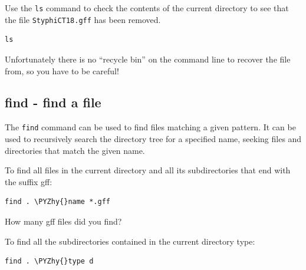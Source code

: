 \documentclass[11pt]{article}
\makeatletter
\def\PYZhy{\char`\-}
\newcommand{\boxspacing}{\kern\kvtcb@left@rule\kern\kvtcb@boxsep}
\newcommand{\prompt}[4]{
        {\ttfamily\llap{{\color{blue}\LARGE\faKeyboardO\hspace{3pt}#4}}\vspace{-\baselineskip}}
    }
\makeatother
\begin{document}
    Use the \texttt{ls} command to check the contents of the current
directory to see that the file \texttt{StyphiCT18.gff} has been removed.

    \begin{tcolorbox}[breakable, size=fbox, boxrule=1pt, pad at break*=1mm,colback=cellbackground, colframe=cellborder]
\prompt{In}{incolor}{ }{\boxspacing}
\begin{Verbatim}[commandchars=\\\{\}]
ls
\end{Verbatim}
\end{tcolorbox}

    Unfortunately there is no ``recycle bin'' on the command line to recover
the file from, so you have to be careful!

    \hypertarget{find---find-a-file}{%
\subsection{find - find a file}\label{find---find-a-file}}

The \texttt{find} command can be used to find files matching a given
pattern. It can be used to recursively search the directory tree for a
specified name, seeking files and directories that match the given name.

    To find all files in the current directory and all its subdirectories
that end with the suffix gff:

    \begin{tcolorbox}[breakable, size=fbox, boxrule=1pt, pad at break*=1mm,colback=cellbackground, colframe=cellborder]
\prompt{In}{incolor}{ }{\boxspacing}
\begin{Verbatim}[commandchars=\\\{\}]
find . \PYZhy{}name *.gff
\end{Verbatim}
\end{tcolorbox}

    How many gff files did you find?

    To find all the subdirectories contained in the current directory type:

    \begin{tcolorbox}[breakable, size=fbox, boxrule=1pt, pad at break*=1mm,colback=cellbackground, colframe=cellborder]
\prompt{In}{incolor}{ }{\boxspacing}
\begin{Verbatim}[commandchars=\\\{\}]
find . \PYZhy{}type d
\end{Verbatim}
\end{tcolorbox}
\end{document}
